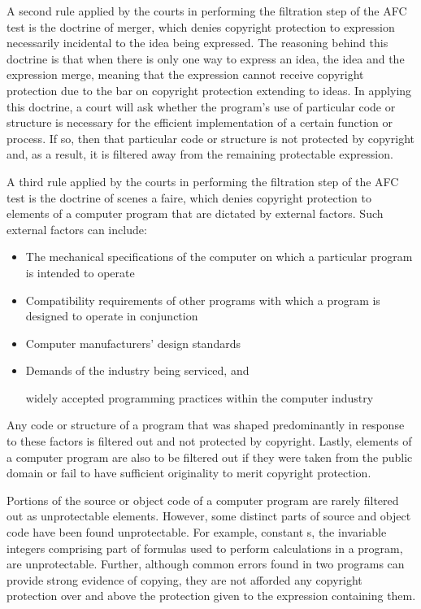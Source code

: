 \documentclass[11pt, letterpaper]{book}
\begin{document}
A second rule applied by the courts in performing the filtration step of
the AFC test is the doctrine of merger, which denies copyright protection
to expression necessarily incidental to the idea being expressed. The
reasoning behind this doctrine is that when there is only one way to
express an idea, the idea and the expression merge, meaning that the
expression cannot receive copyright protection due to the bar on copyright
protection extending to ideas. In applying this doctrine, a court will ask
whether the program's use of particular code or structure is necessary for
the efficient implementation of a certain function or process. If so, then
that particular code or structure is not protected by copyright and, as a
result, it is filtered away from the remaining protectable expression.

A third rule applied by the courts in performing the filtration step of
the AFC test is the doctrine of scenes a faire, which denies copyright
protection to elements of a computer program that are dictated by external
factors. Such external factors can include:

\begin{itemize}

  \item The mechanical
specifications of the computer on which a particular program is intended
to operate

  \item Compatibility requirements of other programs with which a
program is designed to operate in conjunction

  \item Computer manufacturers'
design standards

  \item Demands of the industry being serviced, and

widely accepted programming practices within the computer industry

\end{itemize}

Any code or structure of a program that was shaped predominantly in
response to these factors is filtered out and not protected by
copyright. Lastly, elements of a computer program are also to be filtered
out if they were taken from the public domain or fail to have sufficient
originality to merit copyright protection.

Portions of the source or object code of a computer program are rarely
filtered out as unprotectable elements. However, some distinct parts of
source and object code have been found unprotectable. For example,
constant s, the invariable integers comprising part of formulas used to
perform calculations in a program, are unprotectable. Further, although
common errors found in two programs can provide strong evidence of
copying, they are not afforded any copyright protection over and above the
protection given to the expression containing them.
\end{document}
